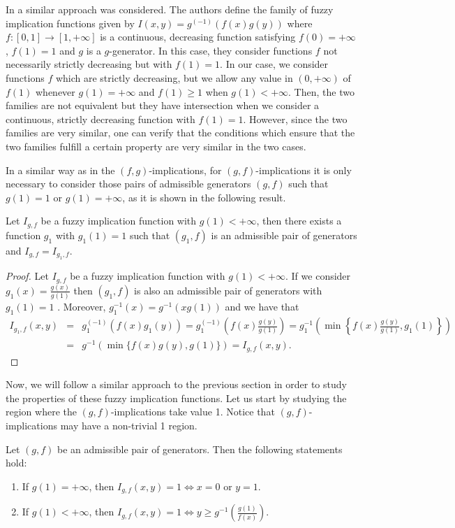 \begin{remark}
	In \cite{PeiZhu2017} a similar approach was considered. The authors define the family of fuzzy implication functions given by $I(x,y)=g^{(-1)}(f(x)g(y))$ where $f:[0,1] \to [1,+\infty]$ is a continuous, decreasing function satisfying $f(0)=+\infty$, $f(1)=1$ and $g$ is a $g$-generator.  In this case, they consider functions $f$ not necessarily strictly decreasing but with $f(1)=1$. In our case, we consider functions $f$ which are strictly decreasing, but we allow any value in $(0,+\infty)$ of $f(1)$ whenever $g(1)=+\infty$ and $f(1) \geq 1 $ when $g(1)< + \infty$. Then, the two families are not equivalent but they have intersection when we consider a continuous, strictly decreasing function with $f(1)=1$. However, since the two families are very similar, one can verify that the conditions which ensure that the two families fulfill a certain property are very similar in the two cases.
\end{remark}
In a similar way as in the $(f,g)$-implications, for $(g,f)$-implications it is only necessary to consider those pairs of admissible generators $(g,f)$ such that $g(1)=1$ or $g(1)=+\infty$, as it is shown in the following result.
\begin{proposition}\label{generadorfinitgf} Let $I_{g,f}$ be a fuzzy implication function with $g(1) < +\infty$, then there exists a function $g_1$ with $g_1(1)=1$ such that $(g_1,f)$ is an admissible pair of generators and $I_{g,f}=I_{g_1,f}$.
\end{proposition}
\begin{proof}
	Let $I_{g,f}$ be a fuzzy implication function with $g(1) < +\infty$. If we consider $g_1(x)=\frac{g(x)}{g(1)}$ then $(g_1,f)$ is also an admissible pair of generators with $g_1(1)=1$ . Moreover, $g_1^{-1}(x)=g^{-1}(xg(1))$ and we have that
	\begin{eqnarray*}
		I_{g_1,f}(x,y)&=&g_1^{(-1)}(f(x)g_1(y))=g_1^{(-1)}\left(f(x)\frac{g(y)}{g(1)}\right) = g_1^{-1} \left(\min \left\lbrace f(x)\frac{g(y)}{g(1)},g_1(1)\right\rbrace\right)\\
		&=&  g^{-1}(\min \{ f(x)g(y),g(1) \} )=I_{g,f}(x,y).
	\end{eqnarray*}
\end{proof}
Now, we will follow a similar approach to the previous section in order to study the properties of these fuzzy implication functions. Let us start by studying the region where the $(g,f)$-implications take value 1. Notice that $(g,f)$-implications may have a non-trivial 1 region.
\begin{proposition}\label{zona1gf} Let $(g,f)$ be an admissible pair of generators. Then the following statements hold:
	\begin{enumerate}[label=(\roman*)]
		\item If $g(1)= + \infty$, then $I_{g,f}(x,y)=1 \Leftrightarrow x=0$ or $y=1$.
		\item If $g(1) < + \infty$, then $I_{g,f}(x,y)=1 \Leftrightarrow y \geq g^{-1}\left(\frac{g(1)}{f(x)}\right)$.
	\end{enumerate}
\end{proposition}
